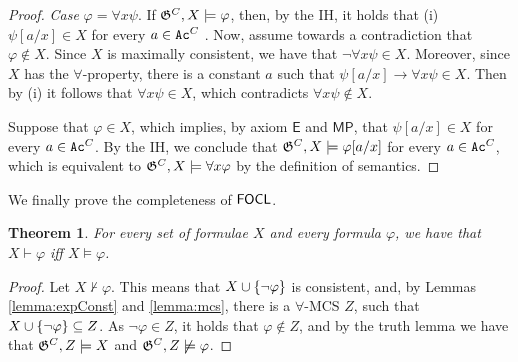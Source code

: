 \documentclass{article}
\newtheorem{theorem}{Theorem}
\begin{document}
\begin{proof}
\textit{Case} $\varphi = \forall x \psi$. If $\mathfrak{G}^C,X\models \varphi$, then, by the IH, it holds that (i) $\psi[a/x]\in X$ for every $a\in \texttt{Ac}^C$ . Now, assume towards a contradiction that $\varphi\not\in X$.  Since $X$ is maximally consistent, we have that $\neg\forall x \psi\in X$. Moreover, since $X$ has the $\forall$-property,  there is a constant $a$ such that $\psi[a/x]\to \forall x \psi \in X$. Then by (i) it follows that %
$\forall x \psi\in X$, which contradicts $\forall x \psi \not \in X$.

Suppose that $\varphi\in X$, which implies, by axiom $\mathsf{E}$ and $\mathsf{MP}$, that $\psi[a/x] \in X$ for every $a\in \texttt{Ac}^C$. By the IH, we conclude that $\mathfrak{G}^C,X\models \varphi [a/x]$ for every $a\in \texttt{Ac}^C$, which is equivalent to $\mathfrak{G}^C,X\models \forall x \varphi$ by the definition of semantics. 
\end{proof}

We finally prove the %
completeness of $\mathsf{FOCL}$.
\begin{theorem}
    For every set of formulae $X$ and every formula $\varphi$, we have that $X\vdash \varphi$ iff $X\models \varphi$.
\end{theorem}
\begin{proof}
    Let $X\not\vdash \varphi$. This means that $X\cup\{\neg\varphi\}$ is consistent, and, by Lemmas \ref{lemma:expConst} and \ref{lemma:mcs}, there is a %
    $\forall$-MCS $Z$, %
    such that $X\cup\{\neg\varphi\} \subseteq Z$. As $\neg\varphi \in Z$, it holds that $\varphi\notin Z$, and by the truth lemma we have that $\mathfrak{G}^C,Z\models X$ and $\mathfrak{G}^C,Z\not\models \varphi$.  
\end{proof}
\end{document}
